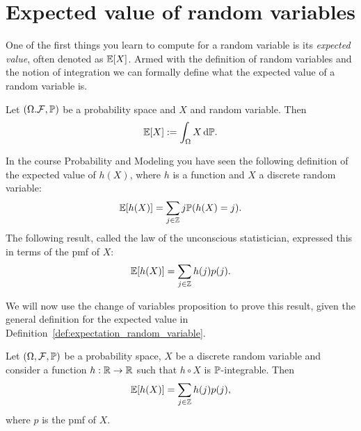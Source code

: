 \section{Expected value of random variables}

One of the first things you learn to compute for a random variable is its \emph{expected value}, often denoted as $\mathbb E[X]$. Armed with the definition of random variables and the notion of integration we can formally define what the expected value of a random variable is.

\begin{definition}\label{def:expectation_random_variable}
Let $(\Omega. \mathcal F, \mathbb P)$ be a probability space and $X$ and random variable. Then
\[
	\mathbb E[X] := \int_\Omega X \, \mathrm{d} \mathbb P.
\]
\end{definition}



In the course Probability and Modeling you have seen the following definition of the expected value of $h(X)$, where $h$ is a function and $X$ a discrete random variable:
\[
	\mathbb E[h(X)] = \sum_{j \in \mathbb Z} j \mathbb P(h(X) = j).
\]
The following result, called the law of the unconscious statistician, expressed this in terms of the pmf of $X$:
\[
	\mathbb E[h(X)] = \sum_{j \in \mathbb Z} h(j) p(j).
\] 

We will now use the change of variables proposition to prove this result, given the general definition for the expected value in Definition~\ref{def:expectation_random_variable}.


\begin{lemma}
Let $(\Omega, \mathcal F, \mathbb{P})$ be a probability space, $X$ be a discrete random variable and consider a function $h : \mathbb R \to \mathbb R$ such that $h\circ X$ is $\mathbb P$-integrable. Then
\[
	\mathbb E[h(X)] = \sum_{j \in \mathbb Z} h(j) p(j),
\] 
where $p$ is the pmf of $X$.
\end{lemma}


